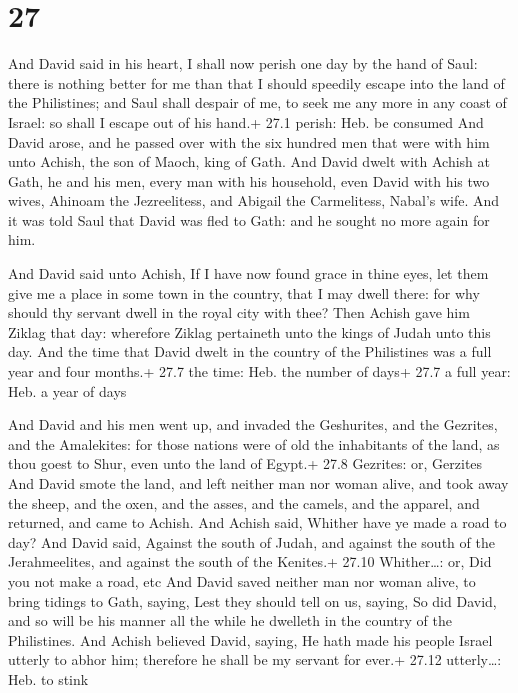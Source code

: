 \hypertarget{section-26}{%
\section{27}\label{section-26}}

 And David said in his heart, I shall now perish one day by
the hand of Saul: there is nothing better for me than that I should
speedily escape into the land of the Philistines; and Saul shall despair
of me, to seek me any more in any coast of Israel: so shall I escape out
of his hand.+ 27.1 perish: Heb. be consumed  And David
arose, and he passed over with the six hundred men that were with him
unto Achish, the son of Maoch, king of Gath.  And David
dwelt with Achish at Gath, he and his men, every man with his household,
even David with his two wives, Ahinoam the Jezreelitess, and Abigail the
Carmelitess, Nabal's wife.  And it was told Saul that David
was fled to Gath: and he sought no more again for him.

 And David said unto Achish, If I have now found grace in
thine eyes, let them give me a place in some town in the country, that I
may dwell there: for why should thy servant dwell in the royal city with
thee?  Then Achish gave him Ziklag that day: wherefore
Ziklag pertaineth unto the kings of Judah unto this day. 
And the time that David dwelt in the country of the Philistines was a
full year and four months.+ 27.7 the time: Heb. the number of days+ 27.7
a full year: Heb. a year of days

 And David and his men went up, and invaded the
Geshurites, and the Gezrites, and the Amalekites: for those nations were
of old the inhabitants of the land, as thou goest to Shur, even unto the
land of Egypt.+ 27.8 Gezrites: or, Gerzites  And David smote
the land, and left neither man nor woman alive, and took away the sheep,
and the oxen, and the asses, and the camels, and the apparel, and
returned, and came to Achish.  And Achish said, Whither
have ye made a road to day? And David said, Against the south of Judah,
and against the south of the Jerahmeelites, and against the south of the
Kenites.+ 27.10 Whither\ldots: or, Did you not make a road, etc
 And David saved neither man nor woman alive, to bring
tidings to Gath, saying, Lest they should tell on us, saying, So did
David, and so will be his manner all the while he dwelleth in the
country of the Philistines.  And Achish believed David,
saying, He hath made his people Israel utterly to abhor him; therefore
he shall be my servant for ever.+ 27.12 utterly\ldots: Heb. to stink

